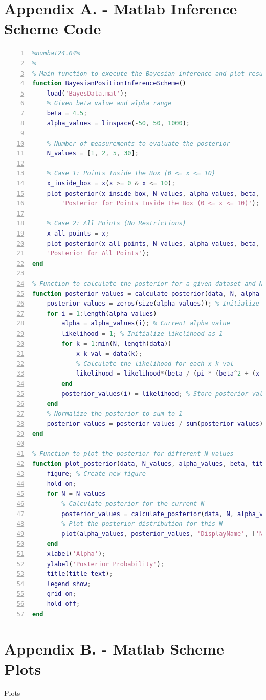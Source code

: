 \documentclass[a4paper,11pt]{article}
\begin{document}
\section{Appendix A. - Matlab Inference Scheme Code}
\begin{lstlisting}[language=Matlab,
                   numbers=left,
                   basicstyle=\footnotesize,
                   stepnumber=1,
                   numbersep=10pt,
                   tabsize=2,
                   showspaces=false,
                   showstringspaces=false]
%%%%%%%%%Bayesian Position Inference Scheme%%%%%%%%%%%%
%numbat24.04%
%
% Main function to execute the Bayesian inference and plot results
function BayesianPositionInferenceScheme()
    load('BayesData.mat');
    % Given beta value and alpha range
    beta = 4.5;
    alpha_values = linspace(-50, 50, 1000);

    % Number of measurements to evaluate the posterior
    N_values = [1, 2, 5, 30];

    % Case 1: Points Inside the Box (0 <= x <= 10)
    x_inside_box = x(x >= 0 & x <= 10);
    plot_posterior(x_inside_box, N_values, alpha_values, beta, ...
        'Posterior for Points Inside the Box (0 <= x <= 10)');

    % Case 2: All Points (No Restrictions)
    x_all_points = x; 
    plot_posterior(x_all_points, N_values, alpha_values, beta, 
    'Posterior for All Points');
end

% Function to calculate the posterior for a given dataset and N points
function posterior_values = calculate_posterior(data, N, alpha_values, beta)
    posterior_values = zeros(size(alpha_values)); % Initialize posterior array
    for i = 1:length(alpha_values)
        alpha = alpha_values(i); % Current alpha value
        likelihood = 1; % Initialize likelihood as 1
        for k = 1:min(N, length(data))
            x_k_val = data(k);
            % Calculate the likelihood for each x_k_val
            likelihood = likelihood*(beta / (pi * (beta^2 + (x_k_val - alpha)^2)));
        end
        posterior_values(i) = likelihood; % Store posterior value
    end
    % Normalize the posterior to sum to 1
    posterior_values = posterior_values / sum(posterior_values);
end

% Function to plot the posterior for different N values
function plot_posterior(data, N_values, alpha_values, beta, title_text)
    figure; % Create new figure
    hold on;
    for N = N_values
        % Calculate posterior for the current N
        posterior_values = calculate_posterior(data, N, alpha_values, beta);
        % Plot the posterior distribution for this N
        plot(alpha_values, posterior_values, 'DisplayName', ['N = ', num2str(N)]);
    end
    xlabel('Alpha');
    ylabel('Posterior Probability');
    title(title_text);
    legend show;
    grid on;
    hold off;
end
\end{lstlisting}

\newpage
\section{Appendix B. - Matlab Scheme Plots}
	Plots
\end{document}
